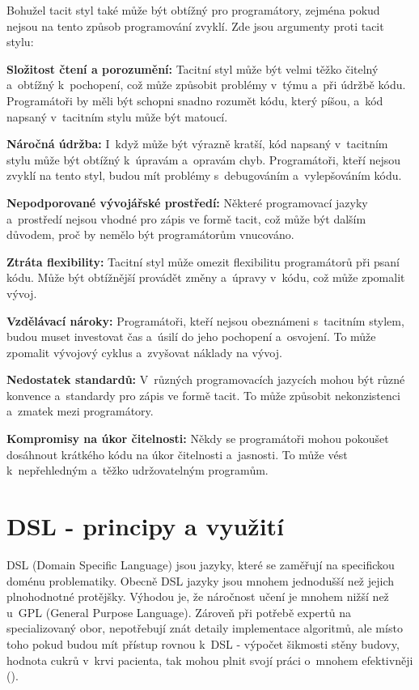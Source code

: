 \documentclass[male, czech]{kithesis}
\begin{document}
Bohužel tacit styl také může být obtížný pro programátory, 
zejména pokud nejsou na tento způsob programování zvyklí. 
Zde jsou argumenty proti tacit stylu:

\textbf{Složitost čtení a porozumění:} 
Tacitní styl může být velmi těžko čitelný a~obtížný k~pochopení, 
což může způsobit problémy v~týmu a~při údržbě kódu. 
Programátoři by měli být schopni snadno rozumět kódu,
který píšou, a~kód napsaný v~tacitním stylu může být matoucí.

\textbf{Náročná údržba:}
I~když může být výrazně kratší, 
kód napsaný v~tacitním stylu může být obtížný k~úpravám a~opravám chyb. 
Programátoři, kteří nejsou zvyklí na tento styl, 
budou mít problémy s~debugováním a~vylepšováním kódu.

\textbf{Nepodporované vývojářské prostředí:}
Některé programovací jazyky
a~prostředí nejsou vhodné pro zápis ve formě tacit, 
což může být dalším důvodem, 
proč by nemělo být programátorům vnucováno.

\textbf{Ztráta flexibility:}
Tacitní styl může omezit flexibilitu programátorů při psaní kódu.
Může být obtížnější provádět změny
a~úpravy v~kódu, což může zpomalit vývoj.

\textbf{Vzdělávací nároky:}
Programátoři, 
kteří nejsou obeznámeni s~tacitním stylem, 
budou muset investovat čas a~úsilí do jeho pochopení a~osvojení. 
To může zpomalit vývojový cyklus a~zvyšovat náklady na vývoj.

\textbf{Nedostatek standardů:}
V~různých programovacích jazycích mohou být různé konvence
a~standardy pro zápis ve formě tacit. 
To může způsobit nekonzistenci a~zmatek mezi programátory.

\textbf{Kompromisy na úkor čitelnosti:}
Někdy se programátoři mohou pokoušet dosáhnout krátkého kódu na úkor čitelnosti a~jasnosti. 
To může vést k~nepřehledným a~těžko udržovatelným programům.

\chapter{DSL - principy a využití}
DSL (Domain Specific Language) jsou jazyky, 
které se zaměřují na specifickou doménu problematiky.
Obecně DSL jazyky jsou mnohem jednodušší než jejich plnohodnotné protějšky. 
Výhodou je, 
že náročnost učení je mnohem nižší než u~GPL (General Purpose Language). 
Zároveň při potřebě expertů na specializovaný obor, 
nepotřebují znát detaily implementace algoritmů, 
ale místo toho pokud budou mít přístup rovnou k~DSL - výpočet šikmosti stěny budovy,
hodnota cukrů v~krvi pacienta, 
tak mohou plnit svojí práci o~mnohem efektivněji (\cite{DomainSpecificLanguages}).
\end{document}

